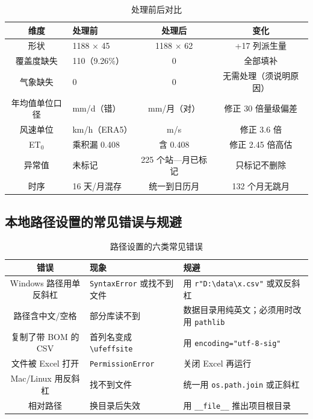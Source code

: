 \documentclass[11pt,a4paper]{ctexart}
\begin{document}
\begin{table}[H]\centering\small
\begin{tabularx}{\textwidth}{|c|X|c|c|}
\toprule
维度 & 处理前 & 处理后 & 变化 \\
\midrule
形状 & 1188 × 45 & 1188 × 62 & +17 列派生量 \\
覆盖度缺失 & 110（9.26\%） & 0 & 全部填补 \\
气象缺失 & 0 & 0 & 无需处理（须说明原因） \\
年均值单位口径 & mm/d（错） & mm/月（对） & 修正 30 倍量级偏差 \\
风速单位 & km/h（ERA5） & m/s & 修正 3.6 倍 \\
ET$_0$ & 乘积漏 0.408 & 含 0.408 & 修正 2.45 倍高估 \\
异常值 & 未标记 & 225 个站—月已标记 & 只标记不删除 \\
时序 & 16 天/月混存 & 统一到日历月 & 132 个月无跳月 \\
\bottomrule
\end{tabularx}
\caption{处理前后对比}
\end{table}

\subsection{本地路径设置的常见错误与规避}

\begin{table}[H]\centering\small
\begin{tabularx}{\textwidth}{|c|X|X|}
\toprule
错误 & 现象 & 规避 \\
\midrule
Windows 路径用单反斜杠 & \texttt{SyntaxError} 或找不到文件 & 用 \texttt{r"D:\textbackslash{}data\textbackslash{}x.csv"} 或双反斜杠 \\
路径含中文/空格 & 部分库读不到 & 数据目录用纯英文；必须用时改用 \texttt{pathlib} \\
复制了带 BOM 的 CSV & 首列名变成 \texttt{\textbackslash ufeffsite} & 用 \texttt{encoding="utf-8-sig"} \\
文件被 Excel 打开 & \texttt{PermissionError} & 关闭 Excel 再运行 \\
Mac/Linux 用反斜杠 & 找不到文件 & 统一用 \texttt{os.path.join} 或正斜杠 \\
相对路径 & 换目录后失效 & 用 \texttt{\_\_file\_\_} 推出项目根目录 \\
\bottomrule
\end{tabularx}
\caption{路径设置的六类常见错误}
\end{table}
\end{document}
